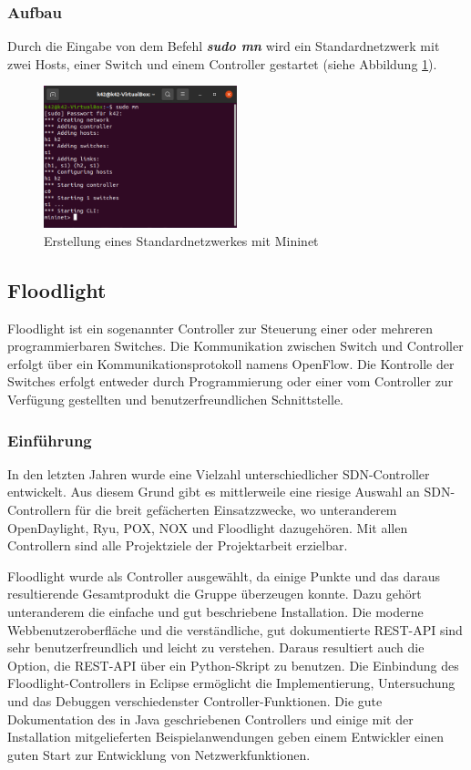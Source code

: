 \documentclass[fontsize=12pt,paper=a4,open=any,parskip=half,
  twoside=false,toc=listof,toc=bibliography,fleqn,leqno,
  captions=nooneline,captions=tableabove,british]{scrbook}
\begin{document}
\subsubsection{Aufbau}
Durch die Eingabe von dem Befehl \textit{\textbf{sudo mn}} wird ein Standardnetzwerk mit zwei Hosts, einer Switch und einem Controller gestartet (siehe Abbildung \ref{sudomn}).

\begin{figure}[H]
 \centering
 \includegraphics[width=0.5\textwidth]{Bilder/sudomn}
 \captionsetup{justification=centering,margin=2cm}
 \caption{Erstellung eines Standardnetzwerkes mit Mininet}
 \label{sudomn}
\end{figure}

\subsection{Floodlight}
Floodlight ist ein sogenannter Controller zur Steuerung einer oder mehreren programmierbaren Switches. Die Kommunikation zwischen Switch und Controller erfolgt über ein Kommunikationsprotokoll namens OpenFlow. Die Kontrolle der Switches erfolgt entweder durch Programmierung oder einer vom Controller zur Verfügung gestellten und benutzerfreundlichen Schnittstelle.

\subsubsection{Einführung}
In den letzten Jahren wurde eine Vielzahl unterschiedlicher SDN-Controller entwickelt. Aus diesem Grund gibt es mittlerweile eine riesige Auswahl an SDN-Controllern für die breit gefächerten Einsatzzwecke, wo unteranderem OpenDaylight, Ryu, POX, NOX und Floodlight dazugehören. Mit allen Controllern sind alle Projektziele der Projektarbeit erzielbar.\par
Floodlight wurde als Controller ausgewählt, da einige Punkte und das daraus resultierende Gesamtprodukt die Gruppe überzeugen konnte. Dazu gehört unteranderem die einfache und gut beschriebene Installation. Die moderne Webbenutzeroberfläche und die verständliche, gut dokumentierte REST-API sind sehr benutzerfreundlich und leicht zu verstehen. Daraus resultiert auch die Option, die REST-API über ein Python-Skript zu benutzen. Die Einbindung des Floodlight-Controllers in Eclipse ermöglicht die Implementierung, Untersuchung und das Debuggen verschiedenster Controller-Funktionen. Die gute Dokumentation des in Java geschriebenen Controllers und einige mit der Installation mitgelieferten Beispielanwendungen geben einem Entwickler einen guten Start zur Entwicklung von Netzwerkfunktionen.
\end{document}
